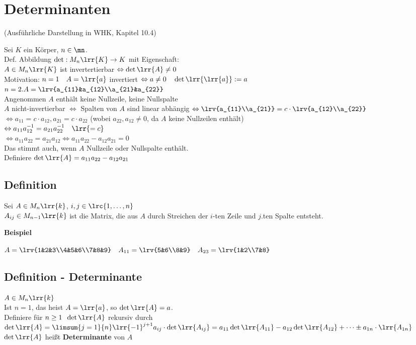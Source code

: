 \newpage
\section{Determinanten}
	(Ausführliche Darstellung in WHK, Kapitel 10.4)
	
	Sei $K$ ein Körper, $n\in\mn$.\\
	Def. Abbildung $\det:M_n\lrr{K}\rightarrow K$ mit Eigenschaft:\\
	$A\in M_n\lrr{K}$ ist invertertierbar $\Leftrightarrow\det\lrr{A}\neq 0$\\
	Motivation: $n=1\quad A=\lrr{a}$ invertiert $\Leftrightarrow a\neq 0\quad\det\lrr{\lrr{a}}:=a$\\
	$n=2. A=\lrv{a_{11}&a_{12}\\a_{21}&a_{22}}$\\
	Angenommen $A$ enthält keine Nullzeile, keine Nullspalte\\
	$A$ nicht-invertierbar $\Leftrightarrow$ Spalten von $A$ sind linear abhängig $\Leftrightarrow\lrv{a_{11}\\a_{21}}=c\cdot\lrv{a_{12}\\a_{22}}$\\
	$\Leftrightarrow a_{11}=c\cdot a_{12}, a_{21}=c\cdot a_{22}$ (wobei $a_{22},a_{12}\neq 0$, da $A$ keine Nullzeilen enthält)\\
	$\Leftrightarrow a_{11}a_{12}^{-1}=a_{21}a_{22}^{-1}\quad \lrr{=c}$\\
	$\Leftrightarrow a_{11}a_{22}=a_{21}a_{12}\Leftrightarrow a_{11}a_{22}-a_{12}a_{21}=0$\\
	Das stimmt auch, wenn $A$ Nullzeile oder Nullspalte enthält.\\
	Definiere $\det\lrr{A}=a_{11}a_{22}-a_{12}a_{21}$
	
\subsection{Definition}
	Sei $A\in M_n\lrr{k}$, $i,j\in\lrc{1,\dots,n}$\\
	$A_{ij}\in M_{n-1}\lrr{k}$ ist die Matrix, die aus $A$ durch Streichen der $i$-ten Zeile und $j$.ten Spalte entsteht.
	
	\textbf{Beispiel}
	
	$A=\lrv{1&2&3\\4&5&6\\7&8&9}\quad A_{11}=\lrv{5&6\\8&9}\quad A_{23}=\lrv{1&2\\7&8}$

\subsection{Definition - Determinante}
	$A\in M_n\lrr{k}$\\
	Ist $n=1$, das heist $A=\lrr{a}$, so $\det\lrr{A}=a$.\\
	Definiere für $n\geq 1 \;\; \det\lrr{A}$ rekursiv durch\\
  $\det\lrr{A}=\limsum{j=1}{n}\lrr{-1}^{j+1}a_{ij}\cdot\det\lrr{A_{ij}}=a_{11}\det\lrr{A_{11}}-a_{12}\det\lrr{A_{12}}+\dots\pm
  a_{1n}\cdot\lrr{A_{1n}}$\\
	$\det\lrr{A}$ heißt \textbf{Determinante} von $A$
	
